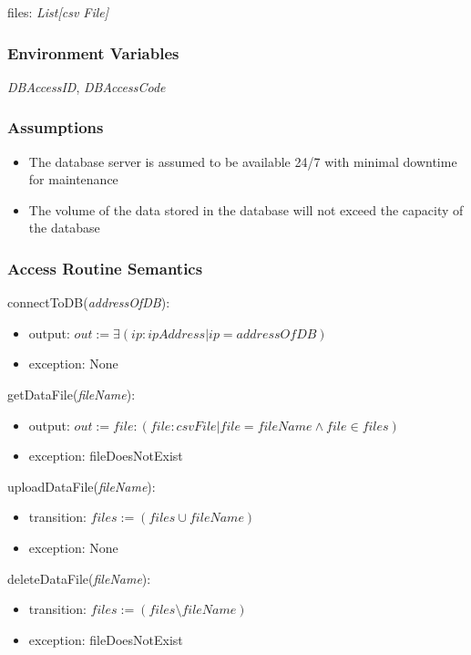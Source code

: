 \documentclass[12pt, titlepage]{article}
\begin{document}
files: \textit{List[csv File]}

\subsubsection{Environment Variables}

\textit{DBAccessID}, \textit{DBAccessCode}

\subsubsection{Assumptions}

\begin{itemize}
  \item The database server is assumed to be available 24/7 with minimal downtime for maintenance 
  \item The volume of the data stored in the database will not exceed the capacity of the database
\end{itemize}

\subsubsection{Access Routine Semantics}

\noindent connectToDB(\textit{addressOfDB}):
\begin{itemize}
\item output: $out := \mathit{\exists( ip: ipAddress|ip=addressOfDB)}$
\item exception: None
\end{itemize}

\noindent getDataFile(\textit{fileName}):
\begin{itemize}
\item output: \(out := file: (file: csv File|file=fileName \land file \in files)\)
\item exception: fileDoesNotExist
\end{itemize}

\noindent uploadDataFile(\textit{fileName}):
\begin{itemize}
\item transition: \(files := (files \cup fileName)\)
\item exception: None
\end{itemize}

\noindent deleteDataFile(\textit{fileName}):
\begin{itemize}
\item transition: \(files := (files \setminus fileName)\)
\item exception: fileDoesNotExist
\end{itemize}
\end{document}

